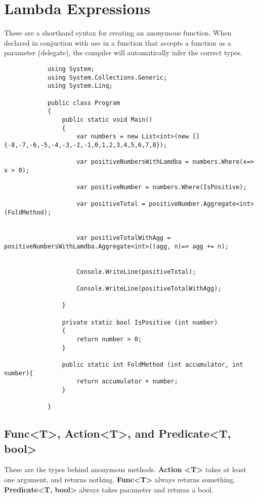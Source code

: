 \documentclass {amsart}
\begin{document}
	\section{Lambda Expressions}  These are a shorthand syntax for creating an anonymous function.  When declared in conjuction with use in a function that accepts a function as a parameter (delegate), the compiler will automatically infer the correct types. 
		\begin{lstlisting}
			using System;
			using System.Collections.Generic;
			using System.Linq;
			
			public class Program
			{
				public static void Main()
				{
					var numbers = new List<int>(new [] {-8,-7,-6,-5,-4,-3,-2,-1,0,1,2,3,4,5,6,7,8});
			
					var positiveNumbersWithLamdba = numbers.Where(x=> x > 0);
			
					var positiveNumber = numbers.Where(IsPositive);
					
					var positiveTotal = positiveNumber.Aggregate<int>(FoldMethod);
			
			
					var positiveTotalWithAgg = positiveNumbersWithLamdba.Aggregate<int>((agg, n)=> agg += n);
			
					
					Console.WriteLine(positiveTotal);
					
					Console.WriteLine(positiveTotalWithAgg);
					
				}
			
				private static bool IsPositive (int number)
				{
					return number > 0;
				}
				
				public static int FoldMethod (int accumulator, int number){
					return accumulator + number;	
				}
				
			}
		\end{lstlisting}


	\subsection{Func\textless  T\textgreater, Action\textless  T\textgreater, and Predicate\textless  T, bool\textgreater} These are the types behind anonymous methods. 
 {\bf Action \textless  T\textgreater} \space takes at least one argument, and returns nothing. {\bf Func\textless  T\textgreater} always returns something.  {\bf Predicate\textless  T, bool\textgreater} always takes  parameter and returns a bool. 
\end{document}
